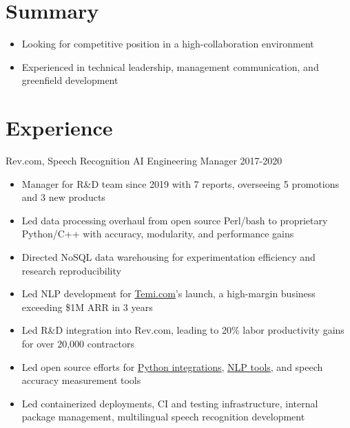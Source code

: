 \documentclass[line,margin]{res}
\begin{document}
    \address{\href{mailto:jdong42@gmail.com}{jdong42@gmail.com}}
    \address{\href{tel:15127759524}{(512) 775-9524}}
\begin{resume}

\vspace{-8pt}
\section{Summary}
    \vspace{22pt}
        \begin{itemize} \itemsep -2pt
        \item Looking for competitive position in a high-collaboration environment
        \item Experienced in technical leadership, management communication, and greenfield development
        \end{itemize}

\vspace{-8pt}
\section{Experience} 
    \vspace{12pt}
    Rev.com, Speech Recognition AI Engineering Manager
    \hfill  2017-2020
        \begin{itemize} \itemsep -2pt
        \item Manager for R\&D team since 2019 with 7 reports, overseeing 5 promotions and 3 new products
        \item Led data processing overhaul from open source Perl/bash to proprietary Python/C++ with accuracy, modularity, and performance gains
        \item Directed NoSQL data warehousing for experimentation efficiency and research reproducibility
        \item Led NLP development for \href{https://temi.com}{Temi.com}'s launch, a high-margin business exceeding \$1M ARR in 3 years
        \item Led R\&D integration into Rev.com, leading to 20\% labor productivity gains for over 20,000 contractors
        \item Led open source efforts for \href{https://github.com/revdotcom/revai-python-sdk}{Python integrations}, \href{https://github.com/revdotcom/words2num}{NLP tools}, and speech accuracy measurement tools
        \item Led containerized deployments, CI and testing infrastructure, internal package management, multilingual speech recognition development
        \end{itemize}


\end{resume}
\end{document}
